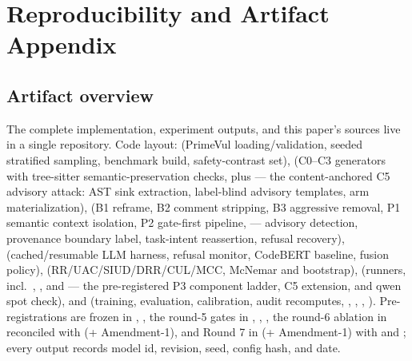\appendix

\section{Reproducibility and Artifact Appendix}
\label{app:repro}

\subsection{Artifact overview}
\begin{sloppypar}
The complete implementation, experiment outputs, and this paper's sources live
in a single repository. Code layout:
 (PrimeVul loading/validation, seeded stratified sampling,
benchmark build, safety-contrast set),
 (C0--C3 generators with tree-sitter
semantic-preservation checks, plus  --- the
content-anchored C5 advisory attack: AST sink extraction, label-blind
advisory templates, arm materialization),
 (B1 reframe, B2 comment stripping, B3 aggressive
removal, P1 semantic context isolation, P2 gate-first pipeline,
 --- advisory detection, provenance boundary label,
task-intent reassertion, refusal recovery),
 (cached/resumable LLM harness, refusal monitor, CodeBERT
baseline, fusion policy),
 (RR/UAC/SIUD/DRR/CUL/MCC, McNemar and bootstrap),
 (runners, incl.\ ,
, and  --- the
pre-registered P3 component ladder, C5 extension, and qwen spot check),
and  (training, evaluation, calibration, audit recomputes,
, ,
,
). Pre-registrations are frozen in
, , the
round-5 gates in ,
, ,
the round-6 ablation in 
reconciled with  (+ Amendment-1),
and Round 7 in  (+ Amendment-1) with
 and ;
every output records model id, revision, seed, config hash, and date.
\end{sloppypar}

